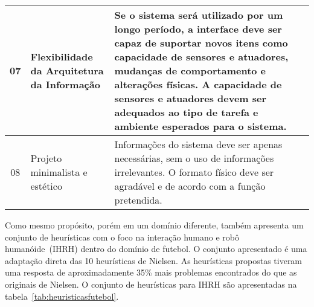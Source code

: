 \begin{table}[!ht]
\begin{tabular}{ c | m{4cm} | m{10cm} }
		\hline
        07 & Flexibilidade da Arquitetura da Informação & Se o sistema será utilizado por um longo período, a interface deve ser capaz de suportar novos itens como capacidade de sensores e atuadores, mudanças de comportamento e alterações físicas. A capacidade de sensores e atuadores devem ser adequados ao tipo de tarefa e ambiente esperados para o sistema. \\
		\hline
        08 & Projeto minimalista e estético & Informações do sistema deve ser apenas necessárias, sem o uso de informações irrelevantes. O formato físico deve ser agradável e de acordo com a função pretendida. \\
		\hline
	\end{tabular}
\end{table}

Como mesmo propósito, porém em um domínio diferente,  também apresenta um conjunto de heurísticas com o foco na interação humano e robô humanóide~(IHRH) dentro do domínio de futebol. O conjunto apresentado é uma adaptação direta das 10 heurísticas de Nielsen. As heurísticas propostas tiveram uma resposta de aproximadamente 35\% mais problemas encontrados do que as originais de Nielsen. O conjunto de heurísticas para IHRH são apresentadas na tabela~\ref{tab:heuristicasfutebol}.

